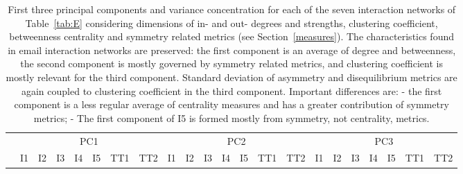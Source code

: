 \documentclass[%
 aip,
 jmp,%
 amsmath,amssymb,
 reprint,%
 floatfix,
]{revtex4-1}
\begin{document}
\begin{table}[!h]
	\caption{First three principal components and variance concentration for each of the seven interaction networks of Table~\ref{tab:E} considering dimensions of in- and out- degrees and strengths, clustering coefficient, betweenness centrality and symmetry related metrics (see Section~\ref{measures}). The characteristics found in email interaction networks are preserved: the first component is an average of degree and betweenness, the second component is mostly governed by symmetry related metrics, and clustering coefficient is mostly relevant for the third component. Standard deviation of asymmetry and disequilibrium metrics are again coupled to clustering coefficient in the third component. Important differences are: - the first component is a less regular average of centrality measures and has a greater contribution of symmetry metrics; - The first component of I5 is formed mostly from symmetry, not centrality, metrics.}
	\footnotesize
	\begin{center}
		\begin{tabular}{| l ||  c |c |c |c |c | c | c || c | c | c | c | c | c | c || c |c |c |c |c | c | c |	}\cline{2-22}
			\multicolumn{1}{c|}{} & \multicolumn{7}{c||}{PC1}          & \multicolumn{7}{c||}{PC2} & \multicolumn{7}{c|}{PC3}  \\\cline{2-22}
			\multicolumn{1}{c|}{} & 
			I1 & I2 & I3 & I4 & I5 & TT1 & TT2 &
			I1 & I2 & I3 & I4 & I5 & TT1 & TT2 &
			I1 & I2 & I3 & I4 & I5 & TT1 & TT2 \\\hline
			
			\hline
		\end{tabular}
	\end{center}
	\label{tab:pcaE3}
\end{table}




\clearpage
\end{document}

